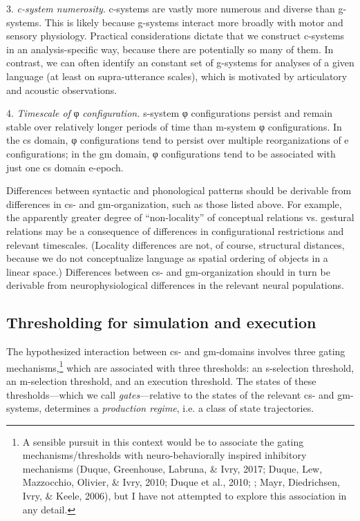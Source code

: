 3. \textit{c-system numerosity}. c-systems are vastly more numerous and diverse than g-systems. This is likely because g-systems interact more broadly with motor and sensory physiology. Practical considerations dictate that we construct c-systems in an analysis-specific way, because there are potentially so many of them. In contrast, we can often identify an constant set of g-systems for analyses of a given language (at least on supra-utterance scales), which is motivated  by articulatory and acoustic observations.

4. \textit{Timescale of} φ \textit{configuration.} s-system φ configurations persist and remain stable over relatively longer periods of time than m-system φ configurations. In the cs domain, φ configurations tend to persist over multiple reorganizations of e configurations; in the gm domain, φ configurations tend to be associated with just one cs domain e-epoch.

  Differences between syntactic and phonological patterns should be derivable from differences in cs- and gm-organization, such as those listed above. For example, the apparently greater degree of “non-locality” of conceptual relations vs. gestural relations may be a consequence of differences in configurational restrictions and relevant timescales. (Locality differences are not, of course, structural distances, because we do not conceptualize language as spatial ordering of objects in a linear space.) Differences between cs- and gm-organization should in turn be derivable from neurophysiological differences in the relevant neural populations.

\subsection{Thresholding for simulation and execution}

The hypothesized interaction between cs- and gm-domains involves three gating mechanisms,\footnote{A sensible pursuit in this context would be to associate the gating mechanisms/thresholds with neuro-behaviorally inspired inhibitory mechanisms (Duque, Greenhouse, Labruna, \& Ivry, 2017; Duque, Lew, Mazzocchio, Olivier, \& Ivry, 2010; Duque et al., 2010; \citealt{DuqueIvry2009}; Mayr, Diedrichsen, Ivry, \& Keele, 2006), but I have not attempted to explore this association in any detail.} which are associated with three thresholds: an s-selection threshold, an m-selection threshold, and an execution threshold. The states of these thresholds—which we call \textit{gates}—relative to the states of the relevant cs- and gm-systems, determines a \textit{production regime}, i.e. a class of state trajectories. 

